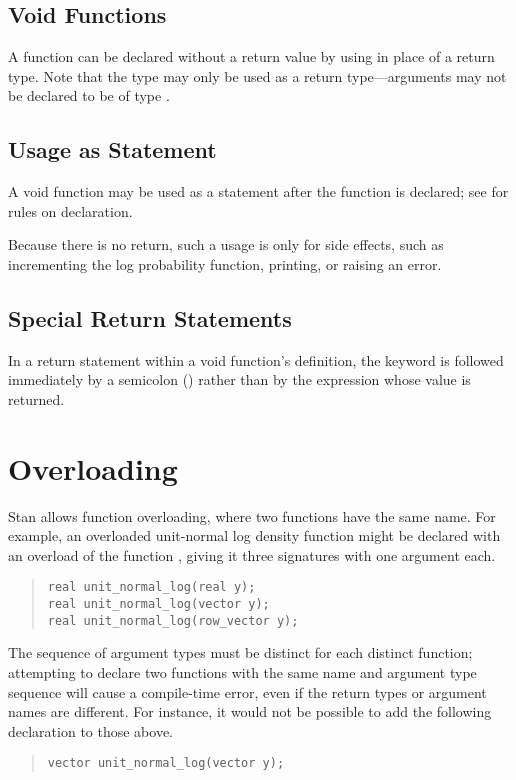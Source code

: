 \subsection{Void Functions}

A function can be declared without a return value by using 
in place of a return type.  Note that the type  may only be
used as a return type---arguments may not be declared to be of type
. 

\subsection{Usage as Statement}

A void function may be used as a statement after the function is
declared;  see  for rules on declaration.

Because there is no return, such a usage is only for side effects,
such as incrementing the log probability function, printing, or
raising an error.

\subsection{Special Return Statements}

In a return statement within a void function's definition, the
 keyword is followed immediately by a semicolon
(\code{;}) rather than by the expression whose value is returned.


\section{Overloading}\label{function-overloading.section}

Stan allows function overloading, where two functions have the same
name.  For example, an overloaded unit-normal log density function
might be declared with an overload of the function
, giving it three signatures with one argument
each.
%
\begin{quote}
\begin{Verbatim}
real unit_normal_log(real y);
real unit_normal_log(vector y);
real unit_normal_log(row_vector y);
\end{Verbatim}
\end{quote}
%
The sequence of argument types must be distinct for each distinct
function; attempting to declare two functions with the same name
and argument type sequence will cause a compile-time error, even if
the return types or argument names are different.  For instance, it
would not be possible to add the following declaration to those
above. 
%
\begin{quote}
\begin{Verbatim}
vector unit_normal_log(vector y);
\end{Verbatim}
\end{quote}


